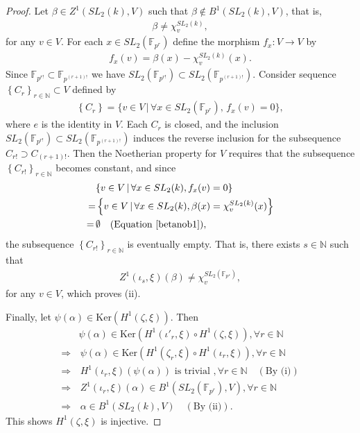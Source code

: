 \begin{proof}
Let $\beta\in Z^1(SL_2(k), V)$ such that $\beta \notin B^1(SL_2(k), V)$, that is,
\begin{align}\label{betanob1}
	\beta \neq \chi^{SL_2(k)}_v,
\end{align}
for any $v \in V$. For each $x\in SL_2(\mathbb{F}_{p^r})$ define the morphism $f_x:V\rightarrow V$ by
	\begin{align*}
		f_x(v) = \beta(x) - \chi^{SL_2(k)}_v(x).
	\end{align*}
Since $\mathbb{F}_{p^{r!}} \subset \mathbb{F}_{p^{(r+1)!}}$ we have $SL_2(\mathbb{F}_{p^{r!}}) \subset SL_2(\mathbb{F}_{p^{(r+1)!}})$.
Consider sequence $\left\{C_{r}\right\}_{r \in \mathbb{N}} \subset V$ defined by
	\begin{align*}
		\left\{C_{r}\right\} = \{v \in V \,|\,\forall x\in SL_2(\mathbb{F}_{p^{r}}),\, f_x(v) = 0\},
	\end{align*}
where $e$ is the identity in $V$.
	Each $C_{r}$ is closed, and the inclusion $SL_2(\mathbb{F}_{p^{r!}}) \subset SL_2(\mathbb{F}_{p^{(r+1)!}})$ induces the reverse inclusion for the subsequence $C_{r!} \supset C_{(r+1)!}$.
Then the Noetherian property for $V$ requires that the subsequence $\left\{C_{r!}\right\}_{r \in \mathbb{N}}$ becomes constant, and since
\begin{align*}
	&\{v \in V \,|\, \forall x \in SL_2(k), f_x(v) = 0\} \\
	= &\left\{v \in V \,|\, \forall x \in SL_2(k), \beta(x) = \chi^{SL_2(k)}_v(x)\right\} \\
	= \,&\emptyset \quad(\textrm{Equation }\ref{betanob1}), 
\end{align*}
the subsequence $\left\{C_{r!}\right\}_{r \in \mathbb{N}}$ is eventually empty.
That is, there exists $s\in\mathbb{N}$ such that
	\begin{align*}
		Z^1(\iota_s, \xi)(\beta) \neq \chi_v^{SL_2(\mathbb{F}_{p^{s}})},
	\end{align*}
	for any $v \in V$, which proves (ii).

Finally, let $\psi(\alpha) \in \mathrm{Ker}\left(H^1(\zeta, \xi)\right)$.
Then
\begin{align*}
	&\psi(\alpha) \in \mathrm{Ker}\left(H^1(\iota'_r, \xi) \circ H^1(\zeta, \xi)\right), \forall r \in \mathbb{N} \\
	\Rightarrow &\,\psi(\alpha) \in \mathrm{Ker}\left(H^1(\zeta_r, \xi) \circ H^1(\iota_r, \xi)\right), \forall r \in \mathbb{N}  \\
	\Rightarrow &\,H^1(\iota_r, \xi)(\psi(\alpha))\textrm{ is trivial }, \forall r \in \mathbb{N} \quad(\textrm{By (i)}) \\
	\Rightarrow &\,Z^1(\iota_r, \xi)(\alpha) \in B^1(SL_2(\mathbb{F}_{p^r}), V), \forall r \in \mathbb{N}  \\
	\Rightarrow &\,\alpha \in B^1(SL_2(k), V)\quad(\textrm{By (ii)}).
\end{align*}
This shows $H^1(\zeta, \xi)$ is injective.
\end{proof}


